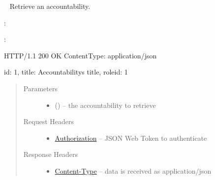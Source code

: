\documentclass[letterpaper,10pt,english]{sphinxmanual}
\begin{document}
\begin{fulllineitems}
\label{\detokenize{resources/accountability:get--accountabilities-(accountability_id)}}~
Retrieve an accountability.

:

\begin{sphinxVerbatim}[commandchars=\\\{\}]
  
 
 
\end{sphinxVerbatim}

:

\begin{sphinxVerbatim}[commandchars=\\\{\}]
HTTP/1.1 200 OK
Content\PYGZhy{}Type: application/json

\PYGZob{}
    \PYGZsq{}id\PYGZsq{}: 1,
    \PYGZsq{}title\PYGZsq{}: \PYGZsq{}Accountability\PYGZsq{}s title\PYGZsq{},
    \PYGZsq{}role\PYGZus{}id\PYGZsq{}: 1
\PYGZcb{}
\end{sphinxVerbatim}
\begin{quote}\begin{description}
\item[{Parameters}] \leavevmode\begin{itemize}
\item {} 
 () -- the accountability to retrieve

\end{itemize}

\item[{Request Headers}] \leavevmode\begin{itemize}
\item {} 
\href{http://tools.ietf.org/html/rfc7235\#section-4.2}{Authorization} -- JSON Web Token to authenticate

\end{itemize}

\item[{Response Headers}] \leavevmode\begin{itemize}
\item {} 
\href{http://tools.ietf.org/html/rfc7231\#section-3.1.1.5}{Content-Type} -- data is received as application/json


\end{itemize}
\end{description}
\end{quote}
\end{fulllineitems}
\end{document}
